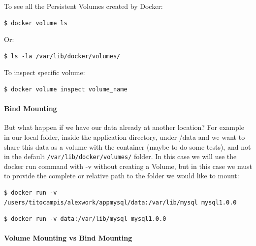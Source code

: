 \documentclass{article}
\newenvironment{codetemplate}[1][]{%
  \mybasecolorbox[#1]
  \itshape
}{%
  \endmybasecolorbox
}
\begin{document}
To see all the Persistent Volumes created by Docker:
\begin{codetemplate}{}
\begin{verbatim}
$ docker volume ls
\end{verbatim}
\end{codetemplate}

Or:
\begin{codetemplate}{}
\begin{verbatim}
$ ls -la /var/lib/docker/volumes/
\end{verbatim}
\end{codetemplate}

To inspect specific volume:
\begin{codetemplate}{}
\begin{verbatim}
$ docker volume inspect volume_name
\end{verbatim}
\end{codetemplate}

\paragraph{Bind Mounting}

But what happen if we have our data already at another location? For example in our local folder, inside the application directory, under /data and we want to share this data as a volume with the container (maybe to do some tests), and not in the default \verb|/var/lib/docker/volumes/| folder. In this case we will use the docker run command with -v without creating a Volume, but in this case we must to provide the complete or relative path to the folder we would like to mount:

\begin{codetemplate}{}
\begin{verbatim}
$ docker run -v /users/titocampis/alexwork/appmysql/data:/var/lib/mysql mysql1.0.0
\end{verbatim}
\end{codetemplate}

\begin{codetemplate}{}
\begin{verbatim}
$ docker run -v data:/var/lib/mysql mysql1.0.0
\end{verbatim}
\end{codetemplate}

\paragraph{Volume Mounting vs Bind Mounting}
\end{document}
